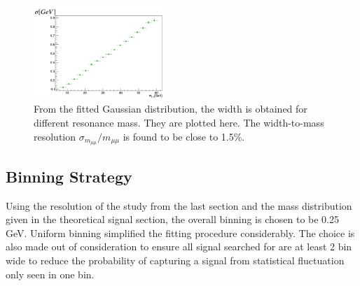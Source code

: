 \begin{figure}[!htb]
    \begin{center}
        \includegraphics[width=0.45\textwidth]{figures/chapter_dimuon/sigma}        
        \caption{
        From the fitted Gaussian distribution, the width is obtained for different resonance mass. They are plotted here. The width-to-mass resolution $\sigma_{m_{\mu\mu}}/m_{\mu\mu}$ is found to be close to 1.5\%.}
    \end{center}
\end{figure}
\FloatBarrier


\subsection{Binning Strategy}
Using the resolution of the study from the last section and the mass distribution given in the theoretical signal section, the overall binning is chosen to be 0.25 GeV. Uniform binning simplified the fitting procedure considerably. The choice is also made out of consideration to ensure all signal searched for are at least 2 bin wide to reduce the probability of capturing a signal from statistical fluctuation only seen in one bin.

%

